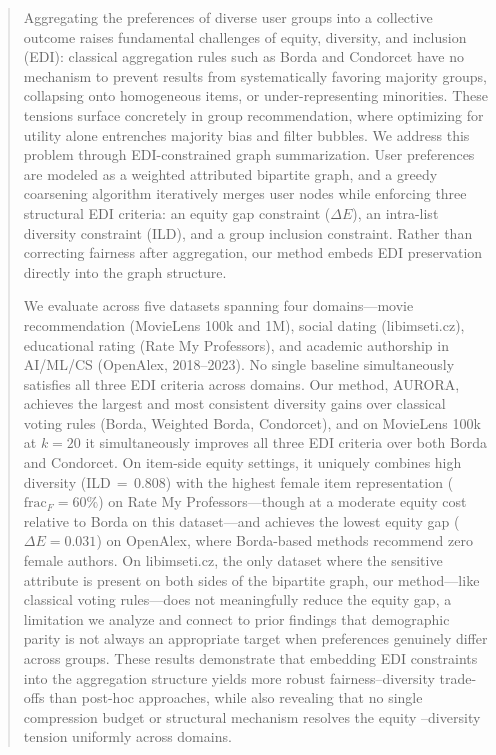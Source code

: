 \documentclass[a4paper,fleqn]{cas-dc}
\begin{document}
\begin{abstract}
Aggregating the preferences of diverse user groups into a collective outcome
raises fundamental challenges of equity, diversity, and inclusion (EDI):
classical aggregation rules such as Borda and Condorcet have no mechanism
to prevent results from systematically favoring majority groups, collapsing
onto homogeneous items, or under-representing minorities. These tensions
surface concretely in group recommendation, where optimizing for utility
alone entrenches majority bias and filter bubbles. We address this problem
through EDI-constrained graph summarization. User preferences are modeled
as a weighted attributed bipartite graph, and a greedy coarsening algorithm
iteratively merges user nodes while enforcing three structural EDI criteria:
an equity gap constraint ($\Delta E$), an intra-list diversity constraint
(ILD), and a group inclusion constraint. Rather than correcting fairness
after aggregation, our method embeds EDI preservation directly into the
graph structure.

We evaluate across five datasets spanning four domains—movie
recommendation (MovieLens 100k and 1M), social dating (libimseti.cz),
educational rating (Rate My Professors), and academic authorship in
AI/ML/CS (OpenAlex, 2018–2023). No single baseline simultaneously
satisfies all three EDI criteria across domains. Our method, AURORA,
achieves the largest and most consistent diversity gains over classical
voting rules (Borda, Weighted Borda, Condorcet), and on MovieLens 100k at
$k=20$ it simultaneously improves all three EDI criteria over both Borda
and Condorcet. On item-side equity settings, it uniquely combines
high diversity (ILD\,$=$\,0.808) with the highest female item
representation ($\mathrm{frac}_F=60\%$) on Rate My Professors—though
at a moderate equity cost relative to Borda on this dataset—and
achieves the lowest equity gap ($\Delta E = 0.031$) on OpenAlex, where
Borda-based methods recommend zero female authors. On libimseti.cz, the
only dataset where the sensitive attribute is present on both sides of the
bipartite graph, our method—like classical voting rules—does not
meaningfully reduce the equity gap, a limitation we
analyze and connect to prior findings that demographic parity is not
always an appropriate target when preferences genuinely differ across
groups. These results demonstrate that embedding EDI constraints into
the aggregation structure yields more robust fairness–diversity trade-offs
than post-hoc approaches, while also revealing that no single
compression budget or structural mechanism resolves the equity
–diversity tension uniformly across domains.
\end{abstract}
\end{document}
